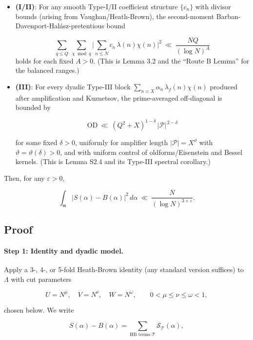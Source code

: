 \documentclass[11pt]{article}
\theoremstyle{definition}
\theoremstyle{remark}
\numberwithin{equation}{part}
\begin{document}
\begin{itemize}
	\item \textbf{(I/II)}: For any smooth Type-I/II coefficient structure $\{c_n\}$ with divisor bounds (arising from Vaughan/Heath-Brown), the second-moment Barban-Davenport-Halász-pretentious bound

	      \begin{equation}\label{eq:D1}
		      \sum_{q\le Q}\ \sum_{\chi\bmod q}\Big|\sum_{n\le N} c_n\,\lambda(n)\chi(n)\Big|^2
		      \ \ll\ \frac{NQ}{(\log N)^A}
	      \end{equation}
	      holds for each fixed $A>0$. (This is Lemma 3.2 and the “Route B Lemma” for the balanced ranges.)

	\item \textbf{(III)}: For every dyadic Type-III block $\sum_{n\asymp X}\alpha_n\,\lambda_f(n)\chi(n)$ produced after amplification and Kuznetsov, the prime-averaged off-diagonal is bounded by

	      \begin{equation}\label{eq:D2}\mathrm{OD}\ \ll\ (Q^2+X)^{1-\delta}\,|\mathcal P|^{\,2-\delta}\end{equation}

	      for some fixed $\delta>0$, uniformly for amplifier length $|\mathcal P|=X^\vartheta$ with $\vartheta=\vartheta(\delta)>0$, and with uniform control of oldforms/Eisenstein and Bessel kernels. (This is Lemma S2.4 and its Type-III spectral corollary.)
\end{itemize}

Then, for any $\varepsilon>0$,

$$
	\int_{\mathfrak m}\big|S(\alpha)-B(\alpha)\big|^2\,d\alpha
	\ \ll\ \frac{N}{(\log N)^{3+\varepsilon}}.
$$

\subsection{Proof}

\paragraph{Step 1: Identity and dyadic model.}
Apply a 3-, 4-, or 5-fold Heath-Brown identity (any standard version suffices) to $\Lambda$ with cut parameters

$$
	U=N^{\mu},\quad V=N^{\nu},\quad W=N^{\omega},\qquad 0<\mu\le\nu\le\omega<1,
$$

chosen below. We write

$$
	S(\alpha)-B(\alpha)
	=\sum_{\text{HB terms }\mathcal T} \mathcal S_{\mathcal T}(\alpha),
$$
\end{document}
